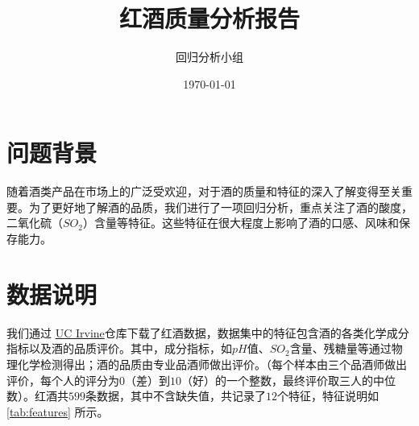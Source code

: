 \documentclass[fontset=ubuntu]{ctexart}
\title{红酒质量分析报告}
\author{回归分析小组}
\date{\today}
\begin{document}
    \maketitle
    \thispagestyle{empty}
    \newpage

    \tableofcontents
    \thispagestyle{empty}
    \newpage
    \setcounter{page}{1} %

    \section{问题背景}
        随着酒类产品在市场上的广泛受欢迎，对于酒的质量和特征的深入了解变得至关重要。为了更好地了解酒的品质，我们进行了一项回归分析，重点关注了酒的酸度，二氧化硫（$SO_2$）含量等特征。这些特征在很大程度上影响了酒的口感、风味和保存能力。 

    \section{数据说明}
        我们通过 \href{https://archive.ics.uci.edu/dataset/186/wine+quality}{UC Irvine}仓库下载了红酒数据，数据集中的特征包含酒的各类化学成分指标以及酒的品质评价。其中，成分指标，如$pH$值、$SO_2$含量、残糖量等通过物理化学检测得出；酒的品质由专业品酒师做出评价。（每个样本由三个品酒师做出评价，每个人的评分为$0$（差）到$10$（好）的一个整数，最终评价取三人的中位数）。红酒共$599$条数据，其中不含缺失值，共记录了$12$个特征，特征说明如 \ref{tab:features} 所示。
\end{document}
